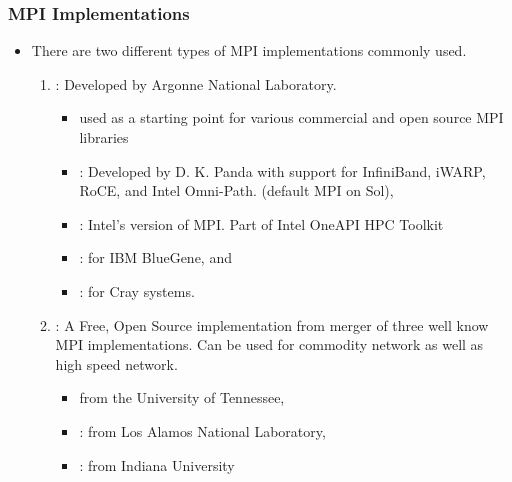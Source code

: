 \documentclass[10pt,t]{beamer}
\begin{document}
\begin{frame}
  \frametitle{MPI Implementations}
  \begin{itemize}
    \item There are two different types of MPI implementations commonly used. 
    \begin{enumerate}
       \item {}: Developed by Argonne National Laboratory.
       \begin{itemize}
           \item used as a starting point for various commercial and open source MPI libraries
           \item {}: Developed by D. K. Panda with support for  InfiniBand, iWARP, RoCE, and Intel Omni-Path. (default MPI on Sol),
           \item {}: Intel's version of MPI. Part of Intel OneAPI HPC Toolkit
           \item {}:  for IBM BlueGene, and 
           \item {}: for Cray systems.
       \end{itemize}
       \item {}: A Free, Open Source implementation from merger of three well know MPI implementations. Can be used for commodity network as well as high speed network.
       \begin{itemize}
           \item {} from the University of Tennessee,
           \item {}: from Los Alamos National Laboratory,
           \item {}: from Indiana University
       \end{itemize}
    \end{enumerate}
  \end{itemize}
\end{frame}
\end{document}
